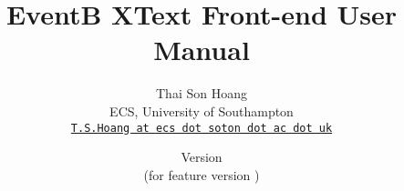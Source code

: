 \documentclass[a4paper,10pt]{article}
\title{EventB XText Front-end User Manual}
\author{%
  Thai Son Hoang\\%
  ECS, University of Southampton\\%
  \texttt{\href{mailto:T.S.Hoang@ecs.soton.ac.uk}{T.S.Hoang at ecs dot soton dot ac dot uk}}%
}%
\date{%
  Version \EventBXTextManualVersion\\%
  (for feature version \EventBXTextFeatureVersion)\\
  \ifplastex
  \EventBXTextManualDate
  \else
  \displaydate{EventBXTextManualDate}%
  \fi
}
\begin{document}
\ifplastex%
\maketitle%
\else%
 \ifstandalone%
 \maketitle %
 \else%
 \fi%
\fi%














\end{document}
